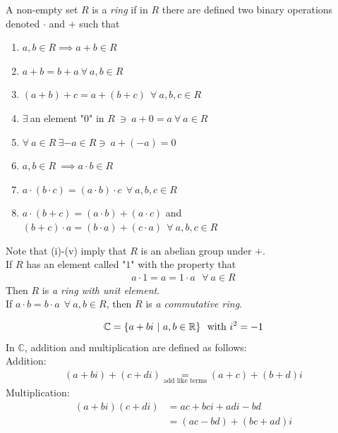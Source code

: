 \begin{definition}[Ring]
A non-empty set $R$ is a \textit{ring} if in $R$ there are defined two binary operations denoted $\cdot$ and $+$ such that
\begin{enumerate}[label=\roman*)]
    \item $a,b \in R \implies a+b \in R$
    \item $a+b=b+a \ \forall \ a,b \in R$
    \item $(a+b)+c = a+(b+c) \ \ \forall \ a,b,c \in R$
    \item $\exists \ $an element "$0$" in $R \ \ni \ a+0=a \ \forall \ a \in R$
    \item $\forall \ a\in R \ \exists -a\in R \ni \ a+(-a)=0$
    \item $a,b\in R \ \implies a\cdot b \in R$
    \item $a\cdot (b\cdot c) = (a\cdot b)\cdot c \ \ \forall \ a,b,c \in R$
    \item $a\cdot (b+c) = (a\cdot b)+(a\cdot c)$ and $(b+c)\cdot a = (b\cdot a)+(c\cdot a) \ \ \forall \ a,b,c\in R$
\end{enumerate}
Note that (i)-(v) imply that $R$ is an abelian group under $+$. \steezybreak\\
If $R$ has an element called "$1$" with the property that 
\begin{align}
    a\cdot 1 = a = 1\cdot a \ \ \ \forall \ a\in R \nonumber
\end{align}
Then $R$ is \textit{a ring with unit element}. \steezybreak\\
If $a\cdot b=b\cdot a \ \ \forall \ a,b\in R$, then $R$ is \textit{a commutative ring}.
\end{definition}
\newpage
\begin{definition} 
\begin{align}
    \mathbb{C} = \{a+bi \ |\ a,b\in {\mathbb{ R}}\} \ \text{ with } i^2=-1 \nonumber
\end{align}
In $\mathbb{C}$, addition and multiplication are defined as follows:\steezybreak\\
Addition:
\begin{align}
    (a+bi)+(c+di) \underset{\text{add like terms}}{=} (a+c)+(b+d)i \nonumber
\end{align}
Multiplication:
\begin{align}
    (a+bi)(c+di)&=ac+bci+adi-bd \nonumber \\
    &= (ac-bd)+(bc+ad)i \nonumber
\end{align}
\end{definition}
